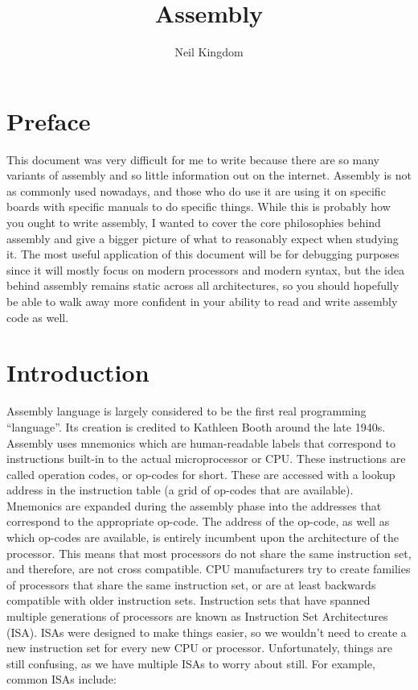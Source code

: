 \documentclass{article}
\title{Assembly}
\author{Neil Kingdom}
\begin{document}
\begin{titlingpage}

\maketitle

\end{titlingpage}

\newpage

\tableofcontents

\newpage

\section{Preface}

   This document was very difficult for me to write because there are so many variants of assembly and so little 
   information out on the internet. Assembly is not as commonly used nowadays, and those who do use it are using it on 
   specific boards with specific manuals to do specific things. While this is probably how you ought to write assembly, 
   I wanted to cover the core philosophies behind assembly and give a bigger picture of what to reasonably expect when 
   studying it. The most useful application of this document will be for debugging purposes since it will mostly focus 
   on modern processors and modern syntax, but the idea behind assembly remains static across all architectures, so you 
   should hopefully be able to walk away more confident in your ability to read and write assembly code as well.

\section{Introduction}

	Assembly language is largely considered to be the first real programming “language”. Its creation is credited to 
   Kathleen Booth around the late 1940s. Assembly uses mnemonics which are human-readable labels that correspond to 
   instructions built-in to the actual microprocessor or CPU. These instructions are called operation codes, or op-codes 
   for short. These are accessed with a lookup address in the instruction table (a grid of op-codes that are available). 
   Mnemonics are expanded during the assembly phase into the addresses that correspond to the appropriate op-code. The 
   address of the op-code, as well as which op-codes are available, is entirely incumbent upon the architecture of the 
   processor. This means that most processors do not share the same instruction set, and therefore, are not cross compatible. 
   CPU manufacturers try to create families of processors that share the same instruction set, or are at least backwards 
   compatible with older instruction sets. Instruction sets that have spanned multiple generations of processors are known 
   as Instruction Set Architectures (ISA). ISAs were designed to make things easier, so we wouldn’t need to create a new 
   instruction set for every new CPU or processor. Unfortunately, things are still confusing, as we have multiple ISAs to 
   worry about still. For example, common ISAs include:
\end{document}
